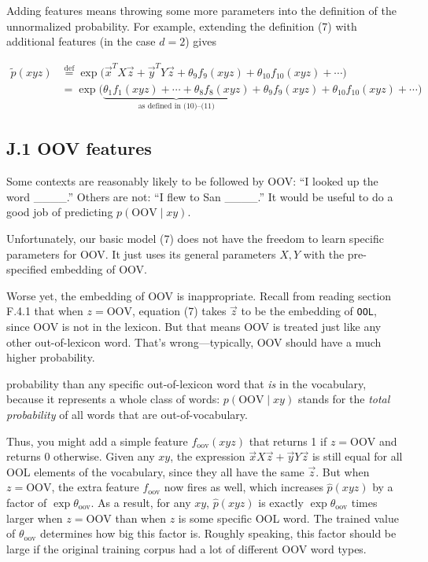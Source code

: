 Adding features means throwing some more parameters into the definition of the unnormalized probability. For example, extending the definition (7) with additional features (in the case $d=2$) gives

\begin{align}
\tilde{p}(xyz) &\stackrel{\mathrm{def}}{=} \exp\Big(\vec{x}^T X \vec{z} + \vec{y}^T Y \vec{z} + \theta_9 f_9(xyz) + \theta_{10} f_{10}(xyz) + \cdots \Big) \\
&= \exp\Bigg(\underbrace{\theta_1 f_1(xyz) + \cdots + \theta_8 f_8(xyz)}_{\text{as defined in (10)--(11)}} + \theta_9 f_9(xyz) + \theta_{10} f_{10}(xyz) + \cdots \Bigg)
\end{align}

\subsection*{J.1 OOV features}

Some contexts are reasonably likely to be followed by OOV: “I looked up the word \_\_\_\_.” Others are not: “I flew to San \_\_\_\_.” It would be useful to do a good job of predicting $p(\text{OOV} \mid xy)$.

Unfortunately, our basic model (7) does not have the freedom to learn specific parameters for OOV. It just uses its general parameters $X, Y$ with the pre-specified embedding of OOV.

Worse yet, the embedding of OOV is inappropriate. Recall from reading section F.4.1 that when $z=\text{OOV}$, equation (7) takes $\vec{z}$ to be the embedding of \texttt{OOL}, since OOV is not in the lexicon. But that means OOV is treated just like any other out-of-lexicon word. That’s wrong—typically, OOV should have a much higher probability.

probability than any specific out-of-lexicon word that \emph{is} in the vocabulary, because it represents a whole 
class of words: $p(\text{OOV} \mid xy)$ stands for the \emph{total probability} of all words that are out-of-vocabulary. 

Thus, you might add a simple feature $f_{\text{oov}}(xyz)$ that returns 1 if $z = \text{OOV}$ and returns 0 otherwise. 
Given any $xy$, the expression $\vec{x}X\vec{z} + \vec{y}Y\vec{z}$ is still equal for all OOL elements of the vocabulary, since they 
all have the same $\vec{z}$. But when $z = \text{OOV}$, the extra feature $f_{\text{oov}}$ now fires as well, which increases $\hat{p}(xyz)$ 
by a factor of $\exp \theta_{\text{oov}}$. As a result, for any $xy$, $\hat{p}(xyz)$ is exactly $\exp \theta_{\text{oov}}$ times larger when $z = \text{OOV}$ than 
when $z$ is some specific OOL word. The trained value of $\theta_{\text{oov}}$ determines how big this factor is. Roughly 
speaking, this factor should be large if the original training corpus had a lot of different OOV word types. 

